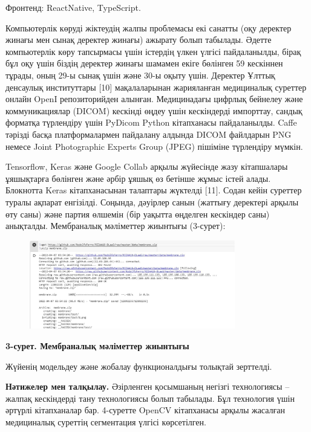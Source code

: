 Фронтенд: ReactNative, TypeScript.

Компьютерлік көруді жіктеудің жалпы проблемасы екі санатты (оқу деректер
жинағы мен сынақ деректер жинағы) ажырату болып табылады. Әдетте
компьютерлік көру тапсырмасы үшін істердің үлкен үлгісі пайдаланылды,
бірақ бұл оқу үшін біздің деректер жинағы шамамен екіге бөлінген 59
кескіннен тұрады, оның 29-ы сынақ үшін және 30-ы оқыту үшін. Деректер
Ұлттық денсаулық институттары {[}10{]} мақалаларынан жарияланған
медициналық суреттер онлайн OpenI репозиторийден алынған. Медицинадағы
цифрлық бейнелеу және коммуникациялар (DICOM) кескінді өңдеу үшін
кескіндерді импорттау, сандық форматқа түрлендіру үшін PyDicom Python
кітапханасы пайдаланылды. Caffe тәрізді басқа платформалармен пайдалану
алдында DICOM файлдарын PNG немесе Joint Photographic Experts Group
(JPEG) пішіміне түрлендіру мүмкін.

Tensorflow, Keras және Google Collab арқылы жүйесінде жазу кітапшалары
ұяшықтарға бөлінген және әрбір ұяшық өз бетінше жұмыс істей алады.
Блокнотта Keras кітапханасынан талаптары жүктелді {[}11{]}. Содан кейін
суреттер туралы ақпарат енгізілді. Соңында, дәуірлер санын (жаттығу
деректері арқылы өту саны) және партия өлшемін (бір уақытта өңделген
кескіндер саны) анықталды. Мембраналық мәліметтер жиынтығы (3-сурет):

\begin{figure}[H]
	\centering
	\includegraphics[width=0.8\textwidth]{assets/193}
	\caption*{}
\end{figure}

{\bfseries 3-сурет. Мембраналық мәліметтер жиынтығы}

Жүйенің модельдеу және жобалау функционалдығы толықтай зерттелді.

{\bfseries Нәтижелер мен талқылау.} Әзірленген қосымшаның негізгі
технологиясы -- жалпақ кескіндерді тану технологиясы болып табылады. Бұл
технология үшін әртүрлі кітапханалар бар. 4-суретте OpenCV кітапханасы
арқылы жасалған медициналық суреттің сегментация үлгісі көрсетілген.

